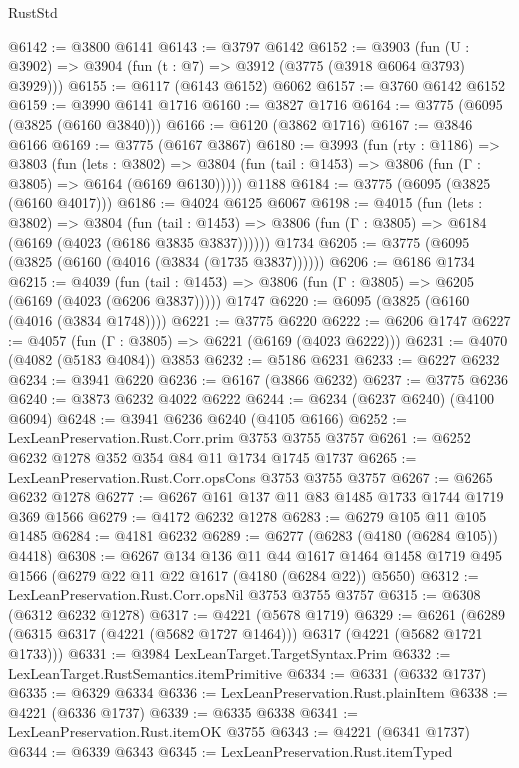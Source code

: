 \begin{lexlean}{RustStd}
\begin{coremodule}
{\begin{coremodule}
{{{{{{{{{{{{{{{{{{{{{{{{{{{{{{{@6142 := @3800 @6141
@6143 := @3797 @6142
@6152 := @3903 (fun (U : @3902) => @3904 (fun (t : @7) => @3912 (@3775 (@3918 @6064 @3793) @3929)))
@6155 := @6117 (@6143 @6152) @6062
@6157 := @3760 @6142 @6152
@6159 := @3990 @6141 @1716
@6160 := @3827 @1716
@6164 := @3775 (@6095 (@3825 (@6160 @3840)))
@6166 := @6120 (@3862 @1716)
@6167 := @3846 @6166
@6169 := @3775 (@6167 @3867)
@6180 := @3993
    (fun (rty : @1186) =>
    @3803
      (fun (lets : @3802) =>
      @3804 (fun (tail : @1453) => @3806 (fun (Γ : @3805) => @6164 (@6169 @6130)))))
    @1188
@6184 := @3775 (@6095 (@3825 (@6160 @4017)))
@6186 := @4024 @6125 @6067
@6198 := @4015
    (fun (lets : @3802) =>
    @3804
      (fun (tail : @1453) => @3806 (fun (Γ : @3805) => @6184 (@6169 (@4023 (@6186 @3835 @3837))))))
    @1734
@6205 := @3775 (@6095 (@3825 (@6160 (@4016 (@3834 (@1735 @3837))))))
@6206 := @6186 @1734
@6215 := @4039
    (fun (tail : @1453) => @3806 (fun (Γ : @3805) => @6205 (@6169 (@4023 (@6206 @3837)))))
    @1747
@6220 := @6095 (@3825 (@6160 (@4016 (@3834 @1748))))
@6221 := @3775 @6220
@6222 := @6206 @1747
@6227 := @4057 (fun (Γ : @3805) => @6221 (@6169 (@4023 @6222)))
@6231 := @4070 (@4082 (@5183 @4084)) @3853
@6232 := @5186 @6231
@6233 := @6227 @6232
@6234 := @3941 @6220
@6236 := @6167 (@3866 @6232)
@6237 := @3775 @6236
@6240 := @3873 @6232 @4022 @6222
@6244 := @6234 (@6237 @6240) (@4100 @6094)
@6248 := @3941 @6236 @6240 (@4105 @6166)
@6252 := LexLeanPreservation.Rust.Corr.prim @3753 @3755 @3757
@6261 := @6252 @6232 @1278 @352 @354 @84 @11 @1734 @1745 @1737
@6265 := LexLeanPreservation.Rust.Corr.opsCons @3753 @3755 @3757
@6267 := @6265 @6232 @1278
@6277 := @6267 @161 @137 @11 @83 @1485 @1733 @1744 @1719 @369 @1566
@6279 := @4172 @6232 @1278
@6283 := @6279 @105 @11 @105 @1485
@6284 := @4181 @6232
@6289 := @6277 (@6283 (@4180 (@6284 @105)) @4418)
@6308 := @6267
    @134
    @136
    @11
    @44
    @1617
    @1464
    @1458
    @1719
    @495
    @1566
    (@6279 @22 @11 @22 @1617 (@4180 (@6284 @22)) @5650)
@6312 := LexLeanPreservation.Rust.Corr.opsNil @3753 @3755 @3757
@6315 := @6308 (@6312 @6232 @1278)
@6317 := @4221 (@5678 @1719)
@6329 := @6261 (@6289 (@6315 @6317 (@4221 (@5682 @1727 @1464))) @6317 (@4221 (@5682 @1721 @1733)))
@6331 := @3984 LexLeanTarget.TargetSyntax.Prim
@6332 := LexLeanTarget.RustSemantics.itemPrimitive
@6334 := @6331 (@6332 @1737)
@6335 := @6329 @6334
@6336 := LexLeanPreservation.Rust.plainItem
@6338 := @4221 (@6336 @1737)
@6339 := @6335 @6338
@6341 := LexLeanPreservation.Rust.itemOK @3755
@6343 := @4221 (@6341 @1737)
@6344 := @6339 @6343
@6345 := LexLeanPreservation.Rust.itemTyped
}}}}}}}}}}}}}}}}}}}}}}}}}}}}}}}
\end{coremodule}}
\end{coremodule}
\end{lexlean}
